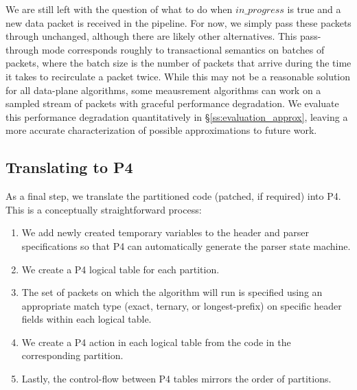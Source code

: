 We are still left with the question of what to do when $in\_progress$ is true
and a new data packet is received in the pipeline. For now, we simply pass
these packets through unchanged, although there are likely other alternatives.
This pass-through mode corresponds roughly to transactional semantics on
batches of packets, where the batch size is the number of packets that arrive
during the time it takes to recirculate a packet twice. While this may not be a
reasonable solution for all data-plane algorithms, some meausrement algorithms
can work on a sampled stream of packets with graceful performance degradation.
We evaluate this performance degradation quantitatively in
\S\ref{ss:evaluation_approx}, leaving a more accurate characterization of possible
approximations to future work.

\subsection{Translating to P4}
As a final step, we translate the partitioned code (patched, if required)
into P4. This is a conceptually straightforward process:
\begin{enumerate}
\item We add newly created temporary variables to the header and parser
specifications so that P4 can automatically generate the parser state machine.
\item We create a P4 logical table for each partition.
\item The set of packets on which the algorithm will run is specified using
an appropriate match type (exact, ternary, or longest-prefix) on specific
header fields within each logical table.
\item We create a P4 action in each logical table from the code in the
corresponding partition.
\item Lastly, the control-flow between P4 tables mirrors the order of
partitions.
\end{enumerate}

%
